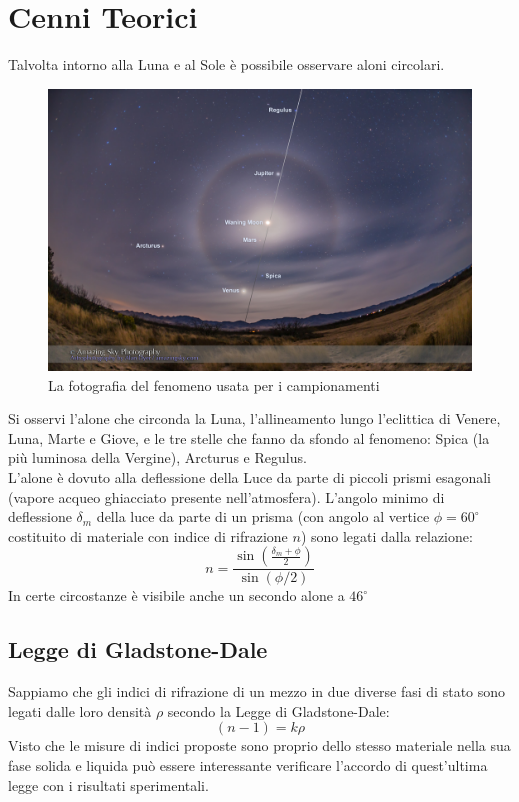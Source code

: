 \documentclass{report}[a4paper,11pt]
\begin{document}
\section{Cenni Teorici}
Talvolta intorno alla Luna e al Sole \`e possibile osservare aloni circolari.
\begin{figure}[htb!]
  \centering
    \includegraphics[width=\linewidth]{./figs/lunar-halo.jpg}
  \caption{La fotografia del fenomeno usata per i campionamenti}
\end{figure}
Si osservi l'alone che circonda la Luna, l'allineamento lungo l'eclittica di Venere, Luna, Marte e Giove, e le tre stelle che fanno da sfondo al fenomeno: Spica (la pi\`u luminosa della Vergine), Arcturus e Regulus.\\
L'alone \`e dovuto alla deflessione della Luce da parte di piccoli prismi esagonali (vapore acqueo ghiacciato presente nell'atmosfera). 
L'angolo minimo di deflessione $\delta_m$ della luce da parte di un prisma (con angolo al vertice $\phi = 60^\circ$ costituito di materiale con indice di rifrazione $n$) sono legati dalla relazione:
\begin{equation}\label{eq:prism}
n = \frac{\sin\left(\frac{\delta_m + \phi}{2}\right)}{\sin (\phi/2)}
\end{equation} 
In certe circostanze \`e visibile anche un secondo alone a $46^\circ$
\subsection*{Legge di Gladstone-Dale}
Sappiamo che gli indici di rifrazione di un mezzo in due diverse fasi di stato sono legati dalle loro densità $\rho$ secondo la Legge di Gladstone-Dale:
\begin{equation}\label{eq:Glad}
(n-1) = k \rho
\end{equation}
Visto che le misure di indici proposte sono proprio dello stesso materiale nella sua fase solida e liquida può essere interessante verificare l'accordo di quest'ultima legge con i risultati sperimentali.
\end{document}
